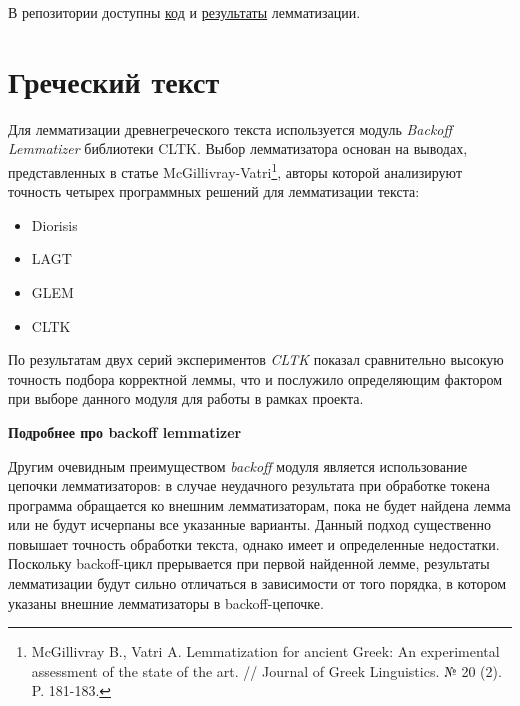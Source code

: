 \documentclass[
  letterpaper,
]{book}
\providecommand{\tightlist}{%
  \setlength{\itemsep}{0pt}\setlength{\parskip}{0pt}}\usepackage{longtable,booktabs,array}
\begin{document}
В репозитории доступны
\href{https://github.com/Drozhzhinastya/GSPC/tree/main/scripts/lemmatization}{код}
и
\href{https://github.com/Drozhzhinastya/GSPC/tree/main/lemmatization/csl}{результаты}
лемматизации.

\hypertarget{sec-lemm_grc}{%
\section{Греческий текст}\label{sec-lemm_grc}}

Для лемматизации древнегреческого текста используется модуль
\emph{Backoff Lemmatizer} библиотеки CLTK. Выбор лемматизатора основан
на выводах, представленных в статье McGillivray-Vatri\footnote{McGillivray
  B., Vatri A. Lemmatization for ancient Greek: An experimental
  assessment of the state of the art. // Journal of Greek Linguistics. №
  20 (2). P. 181-183.}, авторы которой анализируют точность четырех
программных решений для лемматизации текста:

\begin{itemize}
\tightlist
\item
  Diorisis
\item
  LAGT
\item
  GLEM
\item
  CLTK
\end{itemize}

По результатам двух серий экспериментов \emph{CLTK} показал сравнительно
высокую точность подбора корректной леммы, что и послужило определяющим
фактором при выборе данного модуля для работы в рамках проекта.

\begin{tcolorbox}[enhanced jigsaw, opacityback=0, toprule=.15mm, breakable, arc=.35mm, colback=white, left=2mm, bottomrule=.15mm, leftrule=.75mm, colframe=quarto-callout-note-color-frame, rightrule=.15mm]

\textbf{Подробнее про backoff lemmatizer}\vspace{2mm}

Другим очевидным преимуществом \emph{backoff} модуля является
использование цепочки лемматизаторов: в случае неудачного результата при
обработке токена программа обращается ко внешним лемматизаторам, пока не
будет найдена лемма или не будут исчерпаны все указанные варианты.
Данный подход существенно повышает точность обработки текста, однако
имеет и определенные недостатки. Поскольку backoff-цикл прерывается при
первой найденной лемме, результаты лемматизации будут сильно отличаться
в зависимости от того порядка, в котором указаны внешние лемматизаторы в
backoff-цепочке.

\end{tcolorbox}
\end{document}
